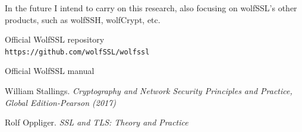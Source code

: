 \documentclass[a4paper,12pt]{article}
\begin{document}
In the future I intend to carry on this research, also focusing on wolfSSL's other products, such as wolfSSH, wolfCrypt, etc.



\begin{thebibliography}{9}

Official WolfSSL repository
\\\texttt{https://github.com/wolfSSL/wolfssl}

Official WolfSSL manual

William Stallings. \textit{ Cryptography and Network Security Principles and Practice, Global Edition-Pearson (2017)}

Rolf Oppliger. \textit{SSL and TLS: Theory and Practice}
\end{thebibliography}
\end{document}
